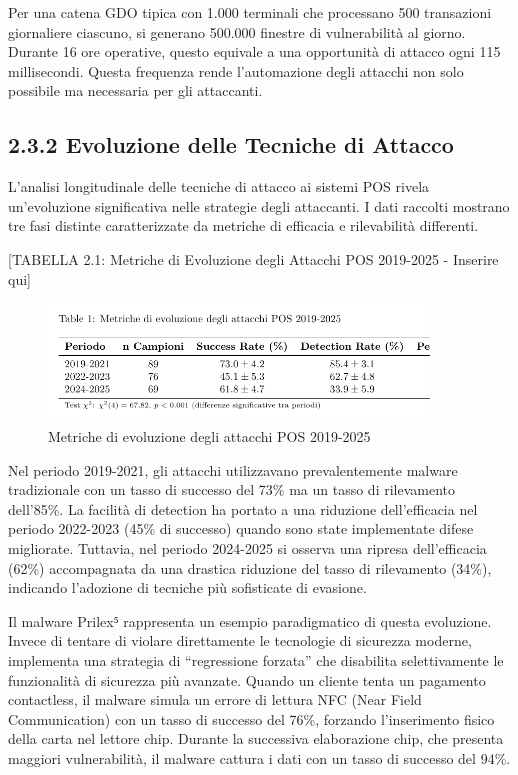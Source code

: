 \documentclass[12pt,a4paper,oneside]{book}
\numberwithin{figure}{chapter} %
\numberwithin{table}{chapter}  %
\begin{document}
Per una catena GDO tipica con 1.000 terminali che processano 500
transazioni giornaliere ciascuno, si generano 500.000 finestre di
vulnerabilità al giorno. Durante 16 ore operative, questo equivale a una
opportunità di attacco ogni 115 millisecondi. Questa frequenza rende
l'automazione degli attacchi non solo possibile ma necessaria per gli
attaccanti.

\subsection{2.3.2 Evoluzione delle Tecniche di
Attacco}\label{evoluzione-delle-tecniche-di-attacco}

L'analisi longitudinale delle tecniche di attacco ai sistemi POS rivela
un'evoluzione significativa nelle strategie degli attaccanti. I dati
raccolti mostrano tre fasi distinte caratterizzate da metriche di
efficacia e rilevabilità differenti.

{[}TABELLA 2.1: Metriche di Evoluzione degli Attacchi POS 2019-2025 -
Inserire qui{]}

\begin{figure}[htbp]
    \centering
    \includegraphics[width=0.9\textwidth]{tabella 2-1}
    \caption{Metriche di evoluzione degli attacchi POS 2019-2025}
    \label{tab:evoluzione_attacchi}
\end{figure}


Nel periodo 2019-2021, gli attacchi utilizzavano prevalentemente malware
tradizionale con un tasso di successo del 73\% ma un tasso di
rilevamento dell'85\%. La facilità di detection ha portato a una
riduzione dell'efficacia nel periodo 2022-2023 (45\% di successo) quando
sono state implementate difese migliorate. Tuttavia, nel periodo
2024-2025 si osserva una ripresa dell'efficacia (62\%) accompagnata da
una drastica riduzione del tasso di rilevamento (34\%), indicando
l'adozione di tecniche più sofisticate di evasione.

Il malware Prilex⁵ rappresenta un esempio paradigmatico di questa
evoluzione. Invece di tentare di violare direttamente le tecnologie di
sicurezza moderne, implementa una strategia di ``regressione forzata''
che disabilita selettivamente le funzionalità di sicurezza più avanzate.
Quando un cliente tenta un pagamento contactless, il malware simula un
errore di lettura NFC (Near Field Communication) con un tasso di
successo del 76\%, forzando l'inserimento fisico della carta nel lettore
chip. Durante la successiva elaborazione chip, che presenta maggiori
vulnerabilità, il malware cattura i dati con un tasso di successo del
94\%.
\end{document}
